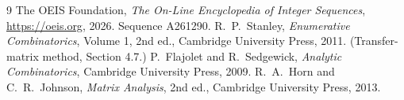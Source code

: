 \documentclass[11pt,a4paper]{article}
\theoremstyle{plain}
\theoremstyle{definition}
\begin{document}
\begin{thebibliography}{9}
 The OEIS Foundation, \emph{The On-Line Encyclopedia of Integer
Sequences}, \url{https://oeis.org}, 2026. Sequence A261290.
 R.~P.~Stanley, \emph{Enumerative Combinatorics}, Volume 1, 2nd ed.,
Cambridge University Press, 2011. (Transfer-matrix method, Section 4.7.)
 P.~Flajolet and R.~Sedgewick, \emph{Analytic Combinatorics}, Cambridge
University Press, 2009.
 R.~A.~Horn and C.~R.~Johnson, \emph{Matrix Analysis}, 2nd ed., Cambridge
University Press, 2013.
\end{thebibliography}
\end{document}
